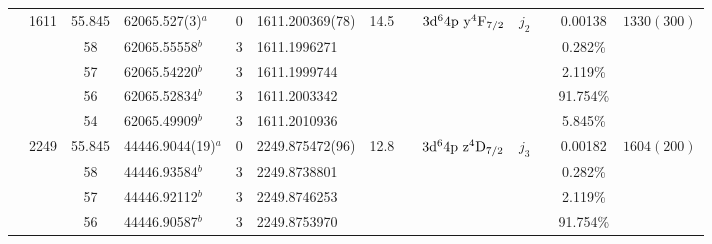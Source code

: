 \begin{table*}
\begin{center}
{\begin{tabular}{:l;l;c;l;c;l;c;l;l;c;c;c;c}
                                  & 1611   & 55.845    & 62065.527(3)$^{a}$               & 0 &   1611.200369(78)  & 14.5 & $                                        $ & $3\rm{d}^64\rm{p~y}^4\rm{F}_{7/2}        $ & $j_{2} $ &              & 0.00138   & $ 1330(300)$\\
\rowstyle{\itshape}               &        & 58        & 62065.55558$^{b}$                & 3 &  1611.1996271      &      & $                                        $ & $                                        $ & $      $ &              & 0.282\%   & $          $\\
\rowstyle{\itshape}               &        & 57        & 62065.54220$^{b}$                & 3 &  1611.1999744      &      & $                                        $ & $                                        $ & $      $ &              & 2.119\%   & $          $\\
\rowstyle{\itshape}               &        & 56        & 62065.52834$^{b}$                & 3 &  1611.2003342      &      & $                                        $ & $                                        $ & $      $ &              & 91.754\%  & $          $\\
\rowstyle{\itshape}               &        & 54        & 62065.49909$^{b}$                & 3 &  1611.2010936      &      & $                                        $ & $                                        $ & $      $ &              & 5.845\%   & $          $\\
                                  & 2249   & 55.845    & 44446.9044(19)$^{a}$             & 0 &   2249.875472(96)  & 12.8 & $                                        $ & $3\rm{d}^64\rm{p~z}^4\rm{D}_{7/2}        $ & $j_{3} $ &              & 0.00182   & $ 1604(200)$\\
\rowstyle{\itshape}               &        & 58        & 44446.93584$^{b}$                & 3 &  2249.8738801      &      & $                                        $ & $                                        $ & $      $ &              & 0.282\%   & $          $\\
\rowstyle{\itshape}               &        & 57        & 44446.92112$^{b}$                & 3 &  2249.8746253      &      & $                                        $ & $                                        $ & $      $ &              & 2.119\%   & $          $\\
\rowstyle{\itshape}               &        & 56        & 44446.90587$^{b}$                & 3 &  2249.8753970      &      & $                                        $ & $                                        $ & $      $ &              & 91.754\%  & $          $\\

\end{tabular}}
\end{center}
\end{table*}
